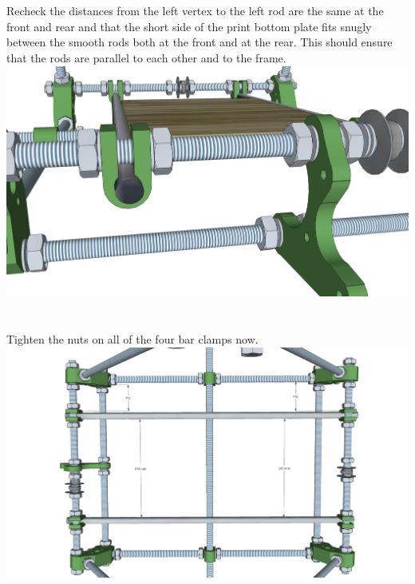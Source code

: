 \documentclass[twoside,a4paper,titlepage]{memoir}
\begin{document}
	\section{}
	Recheck the distances from the left vertex to the left rod are the same at the front and rear and that the
	short side of the print bottom plate fits snugly between the smooth rods both at the front and at the rear.
	This should ensure that the rods are parallel to each other and to the frame.\\
	\includegraphics[width=1\linewidth]{graphics/ch6_9.png}
	
	\section{}
	Tighten the nuts on all of the four bar clamps now.\\
	\includegraphics[width=1\linewidth]{graphics/ch6_10.png}
	
\end{document}
